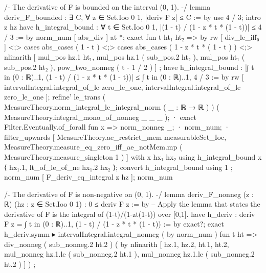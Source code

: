 /-
The derivative of F is bounded on the interval (0, 1).
-/
lemma deriv_F_bounded : ∃ C, ∀ z ∈ Set.Ioo 0 1, |deriv F z| ≤ C := by
  use 4 / 3;
  intro z hz
  have h_integral_bound : ∀ t ∈ Set.Ioo 0 1, |(1 - t) / (1 - z * t * (1 - t))| ≤ 4 / 3 := by
    norm_num [ abs_div ] at *;
    exact fun t ht₁ ht₂ => by rw [ div_le_iff₀ ] <;> cases abs_cases ( 1 - t ) <;> cases abs_cases ( 1 - z * t * ( 1 - t ) ) <;> nlinarith [ mul_pos hz.1 ht₁, mul_pos hz.1 ( sub_pos.2 ht₂ ), mul_pos ht₁ ( sub_pos.2 ht₂ ), pow_two_nonneg ( t - 1 / 2 ) ] ;
  have h_integral_bound : |∫ t in (0 : ℝ)..1, (1 - t) / (1 - z * t * (1 - t))| ≤ ∫ t in (0 : ℝ)..1, 4 / 3 := by
    rw [ intervalIntegral.integral_of_le zero_le_one, intervalIntegral.integral_of_le zero_le_one ];
    refine' le_trans ( MeasureTheory.norm_integral_le_integral_norm ( _ : ℝ → ℝ ) ) ( MeasureTheory.integral_mono_of_nonneg _ _ _ );
    · exact Filter.Eventually.of_forall fun x => norm_nonneg _;
    · norm_num;
    · filter_upwards [ MeasureTheory.ae_restrict_mem measurableSet_Ioc, MeasureTheory.measure_eq_zero_iff_ae_notMem.mp ( MeasureTheory.measure_singleton 1 ) ] with x hx₁ hx₂ using h_integral_bound x ⟨ hx₁.1, lt_of_le_of_ne hx₁.2 hx₂ ⟩;
  convert h_integral_bound using 1 ; norm_num [ F_deriv_eq_integral z hz ];
  norm_num

/-
The derivative of F is non-negative on (0, 1).
-/
lemma deriv_F_nonneg (z : ℝ) (hz : z ∈ Set.Ioo 0 1) : 0 ≤ deriv F z := by
  -- Apply the lemma that states the derivative of F is the integral of (1-t)/(1-zt(1-t)) over [0,1].
  have h_deriv : deriv F z = ∫ t in (0 : ℝ)..1, (1 - t) / (1 - z * t * (1 - t)) := by
    exact?;
  exact h_deriv.symm ▸ intervalIntegral.integral_nonneg ( by norm_num ) fun t ht => div_nonneg ( sub_nonneg.2 ht.2 ) ( by nlinarith [ hz.1, hz.2, ht.1, ht.2, mul_nonneg hz.1.le ( sub_nonneg.2 ht.1 ), mul_nonneg hz.1.le ( sub_nonneg.2 ht.2 ) ] ) ;


